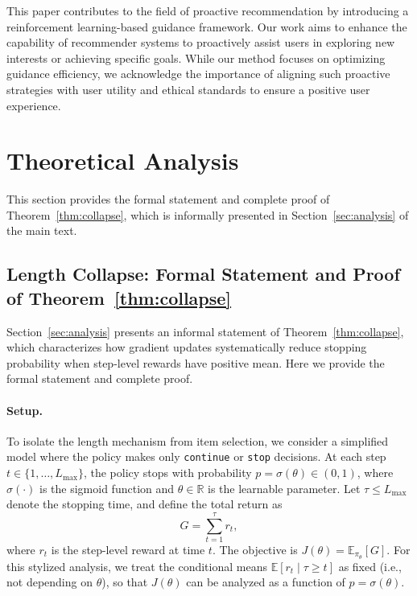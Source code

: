 \documentclass{llmxive}
\begin{document}
This paper contributes to the field of proactive recommendation by introducing a reinforcement learning-based guidance framework. Our work aims to enhance the capability of recommender systems to proactively assist users in exploring new interests or achieving specific goals. While our method focuses on optimizing guidance efficiency, we acknowledge the importance of aligning such proactive strategies with user utility and ethical standards to ensure a positive user experience.





\appendix


\section{Theoretical Analysis}
\label{app:theory}

This section provides the formal statement and complete proof of Theorem~\ref{thm:collapse}, which is informally presented in Section~\ref{sec:analysis} of the main text.

\subsection{Length Collapse: Formal Statement and Proof of Theorem~\ref{thm:collapse}}
\label{app:length_collapse}

Section~\ref{sec:analysis} presents an informal statement of Theorem~\ref{thm:collapse}, which characterizes how gradient updates systematically reduce stopping probability when step-level rewards have positive mean. Here we provide the formal statement and complete proof.

\paragraph{Setup.} To isolate the length mechanism from item selection, we consider a simplified model where the policy makes only \texttt{continue} or \texttt{stop} decisions. At each step $t \in \{1, \ldots, L_{\max}\}$, the policy stops with probability $p = \sigma(\theta) \in (0,1)$, where $\sigma(\cdot)$ is the sigmoid function and $\theta \in \mathbb{R}$ is the learnable parameter. Let $\tau \leq L_{\max}$ denote the stopping time, and define the total return as
\begin{equation}
    G = \sum_{t=1}^{\tau} r_t,
\end{equation}
where $r_t$ is the step-level reward at time $t$. The objective is $J(\theta) = \mathbb{E}_{\pi_\theta}[G]$. For this stylized analysis, we treat the conditional means $\mathbb{E}[r_t \mid \tau \ge t]$ as fixed (i.e., not depending on $\theta$), so that $J(\theta)$ can be analyzed as a function of $p=\sigma(\theta)$.
\end{document}
